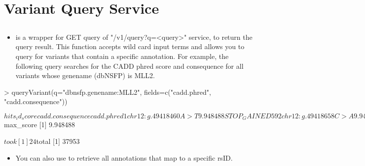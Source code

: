 \documentclass[12pt]{article}
\begin{document}
\section{Variant Query Service}

\subsection{}

\begin{itemize}
\item {} is a wrapper for GET query of "/v1/query?q=<query>" service, to return  the query result. This function accepts wild card input terms and allows you to query for variants that contain a specific annotation. For example, the following query searches for the CADD phred score and consequence for all variants whose genename (dbNSFP) is MLL2.
\end{itemize}



\begin{Schunk}
\begin{Sinput}
> queryVariant(q="dbnsfp.genename:MLL2", fields=c("cadd.phred", "cadd.consequence"))
\end{Sinput}
\begin{Soutput}
$hits
                   _id   _score cadd.consequence cadd.phred
1  chr12:g.49418460A>T 9.948488      STOP_GAINED         59
2  chr12:g.49418658C>A 9.948488      STOP_GAINED         57
3  chr12:g.49420281G>T 9.948488      STOP_GAINED         59
4  chr12:g.49420340T>A 9.948488      STOP_GAINED         53
5  chr12:g.49420364T>A 9.948488      STOP_GAINED         53
6  chr12:g.49420844C>A 9.948488      STOP_GAINED         53
7  chr12:g.49420888G>C 9.948488      STOP_GAINED         53
8  chr12:g.49421602A>T 9.948488      STOP_GAINED         53
9  chr12:g.49421807C>A 9.948488      STOP_GAINED         57
10 chr12:g.49422661T>A 9.948488      STOP_GAINED         45

$max_score
[1] 9.948488

$took
[1] 24

$total
[1] 37953
\end{Soutput}
\end{Schunk}

\begin{itemize}
\item You can also use  to retrieve all annotations that map to a specific rsID.
\end{itemize}
\end{document}
